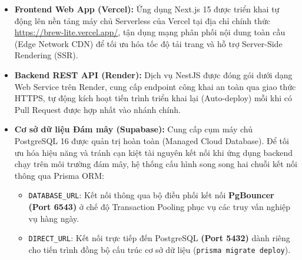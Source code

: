 \begin{itemize}
    \item \textbf{Frontend Web App (Vercel):} Ứng dụng Next.js 15 được triển khai tự động lên nền tảng máy chủ Serverless của Vercel tại địa chỉ chính thức \url{https://brew-lite.vercel.app/}, tận dụng mạng phân phối nội dung toàn cầu (Edge Network CDN) để tối ưu hóa tốc độ tải trang và hỗ trợ Server-Side Rendering (SSR).
    \item \textbf{Backend REST API (Render):} Dịch vụ NestJS được đóng gói dưới dạng Web Service trên Render, cung cấp endpoint công khai an toàn qua giao thức HTTPS, tự động kích hoạt tiến trình triển khai lại (Auto-deploy) mỗi khi có Pull Request được hợp nhất vào nhánh chính.
    \item \textbf{Cơ sở dữ liệu Đám mây (Supabase):} Cung cấp cụm máy chủ PostgreSQL 16 được quản trị hoàn toàn (Managed Cloud Database). Để tối ưu hóa hiệu năng và tránh cạn kiệt tài nguyên kết nối khi ứng dụng backend chạy trên môi trường đám mây, hệ thống cấu hình song song hai chuỗi kết nối thông qua Prisma ORM:
    \begin{itemize}
        \item \texttt{DATABASE\_URL}: Kết nối thông qua bộ điều phối kết nối \textbf{PgBouncer (Port 6543)} ở chế độ Transaction Pooling phục vụ các truy vấn nghiệp vụ hàng ngày.
        \item \texttt{DIRECT\_URL}: Kết nối trực tiếp đến PostgreSQL \textbf{(Port 5432)} dành riêng cho tiến trình đồng bộ cấu trúc cơ sở dữ liệu (\texttt{prisma migrate deploy}).
    \end{itemize}
\end{itemize}

